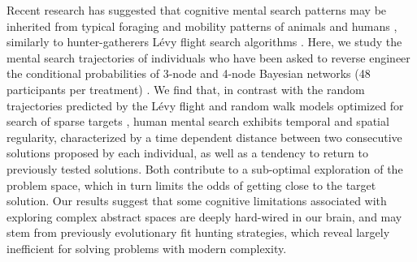Recent research \cite{baronchelli2013levy} has suggested that cognitive mental search patterns \cite{rhodes2007human,radicchi2012rationality,radicchi2012evolution} may be inherited 
from typical foraging and mobility patterns of animals \cite{viswanathan1996levy,ramos2004levy,reynolds2007displaced} and humans \cite{gonzalez2008understanding,song2010modelling,rhee2011levy}, similarly to 
hunter-gatherers L\'evy flight search algorithms \cite{brown2007levy,raichlen2014evidence}. Here, we study the mental search trajectories of  
individuals who have been asked to reverse engineer the conditional probabilities of 3-node and 4-node Bayesian 
networks (48 participants per treatment) \cite{steyvers2003inferring,pearl2009causality}. We find that, in contrast with the random 
trajectories predicted by the L\'evy flight and random walk models optimized for search of sparse targets \cite{viswanathan1999optimizing,edwards2007revisiting,song2010modelling,viswanathan2011physics}, human mental 
search exhibits temporal and spatial regularity, characterized by a time dependent distance 
between two consecutive solutions proposed by each individual, as well as a tendency 
to return to previously tested solutions. Both contribute to a sub-optimal exploration of the 
problem space, which in turn limits the odds of getting close to the target solution. Our results 
suggest that some cognitive limitations associated with exploring complex abstract spaces are 
deeply hard-wired in our brain, and may stem from previously evolutionary fit hunting strategies, 
which reveal largely inefficient for solving problems with modern complexity.
